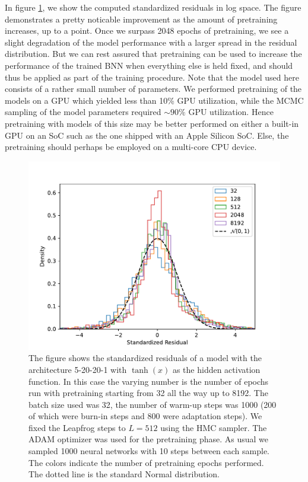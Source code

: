 In figure \ref{fig:std_residual_vs_pretraining}, we
show the computed standardized residuals in log space. The figure demonstrates a pretty noticable improvement as the amount of pretraining increases, up to a point. Once we surpass 2048 epochs of pretraining, we see a slight degradation of the model performance with a larger spread in the residual distribution. But we can rest assured that pretraining can be used to increase the performance of the trained BNN when everything else is held fixed, and should thus be applied as part of the training procedure. Note that the model used here consists of a rather small number of parameters. We performed pretraining of the models on a GPU which yielded less than 10\% GPU utilization, while the MCMC sampling of the model parameters required $\sim 90\%$ GPU utilization. Hence pretraining with models of this size may be better performed on either a built-in GPU on an SoC such as the one shipped with an Apple Silicon SoC. Else, the pretraining should perhaps be employed on a multi-core CPU device.
\begin{figure}[H]
    \centering
    \includegraphics[scale=0.7]{figures/standardized_residuals/effect_of_pretraining/standardized_residuals_hmc_vs_pretraining_steps.pdf}
    \caption{The figure shows the standardized residuals of a model with the architecture 5-20-20-1 with $\tanh(x)$ as the
    hidden activation function. In this case the varying number is the number of epochs run with pretraining starting from 32 all the way up to 8192. The batch size used was 32, the number of warm-up steps was 1000 (200 of which were burn-in steps and 800 were adaptation steps). We fixed the Leapfrog steps to $L = 512$ using the HMC sampler. The ADAM optimizer was used for the pretraining phase. As usual we sampled 1000 neural networks with 10 steps between each sample. The colors indicate the number of pretraining epochs performed. The dotted line is the standard Normal distribution.
    }
    \label{fig:std_residual_vs_pretraining}
\end{figure}

